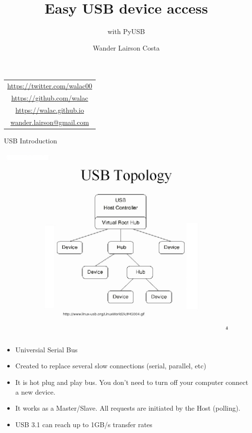 \documentclass[pdf]{beamer}
\title[PyUSB]{Easy USB device access}
\subtitle{with PyUSB}
\author{{\Large Wander Lairson Costa}}
\institute{{\large Mozilla Corporation}}
\date{}
\begin{document}
\begin{frame}
  \titlepage
  \begin{center}
    \begin{tabular}{c}
      \url{https://twitter.com/walac00} \\
      \url{https://github.com/walac} \\
      \url{https://walac.github.io} \\
      \href{mailto:wander.lairson@gmail.com}{wander.lairson@gmail.com} \\
    \end{tabular}
  \end{center}
\end{frame}

\begin{frame}{USB Introduction}
  \begin{center}
    \includegraphics[scale=0.15]{img/topology.jpg}
  \end{center}
  \begin{itemize}
    \tiny
    \item Universial Serial Bus
    \item Created to replace several slow connections (serial, parallel, etc)
    \item It is hot plug and play bus. You don't need to turn off your computer
        connect a new device.
    \item It works as a Master/Slave. All requests are initiated by the Host (polling).
    \item USB 3.1 can reach up to 1GB/s transfer rates
  \end{itemize}
\end{frame}
\end{document}
